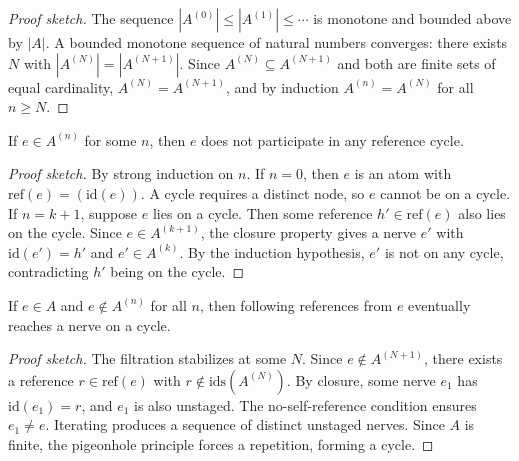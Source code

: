 \begin{proof}[Proof sketch]
The sequence $|A^{(0)}| \leq |A^{(1)}| \leq \cdots$ is monotone and bounded above by $|A|$.  A bounded monotone sequence of natural numbers converges: there exists $N$ with $|A^{(N)}| = |A^{(N+1)}|$.  Since $A^{(N)} \subseteq A^{(N+1)}$ and both are finite sets of equal cardinality, $A^{(N)} = A^{(N+1)}$, and by induction $A^{(n)} = A^{(N)}$ for all $n \geq N$.
\end{proof}

\begin{theorem}
If $e \in A^{(n)}$ for some $n$, then $e$ does not participate in any reference cycle.
\end{theorem}

\begin{proof}[Proof sketch]
By strong induction on $n$.  If $n = 0$, then $e$ is an atom with $\mathrm{ref}(e) = (\mathrm{id}(e))$.  A cycle requires a distinct node, so $e$ cannot be on a cycle.  If $n = k+1$, suppose $e$ lies on a cycle.  Then some reference $h' \in \mathrm{ref}(e)$ also lies on the cycle.  Since $e \in A^{(k+1)}$, the closure property gives a nerve $e'$ with $\mathrm{id}(e') = h'$ and $e' \in A^{(k)}$.  By the induction hypothesis, $e'$ is not on any cycle, contradicting $h'$ being on the cycle.
\end{proof}

\begin{theorem}
If $e \in A$ and $e \notin A^{(n)}$ for all $n$, then following references from $e$ eventually reaches a nerve on a cycle.
\end{theorem}

\begin{proof}[Proof sketch]
The filtration stabilizes at some $N$.  Since $e \notin A^{(N+1)}$, there exists a reference $r \in \mathrm{ref}(e)$ with $r \notin \mathrm{ids}(A^{(N)})$.  By closure, some nerve $e_1$ has $\mathrm{id}(e_1) = r$, and $e_1$ is also unstaged.  The no-self-reference condition ensures $e_1 \neq e$.  Iterating produces a sequence of distinct unstaged nerves.  Since $A$ is finite, the pigeonhole principle forces a repetition, forming a cycle.
\end{proof}
